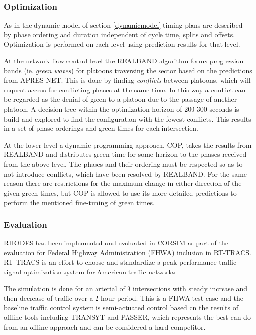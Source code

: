 \subsubsection*{Optimization}
As in the dynamic model of section \ref{dynamicmodel} timing plans are described by phase ordering and duration independent of cycle time, splits and offsets. 
Optimization is performed on each level using prediction results for that level.

At the network flow control level the REALBAND algorithm forms progression bands (ie. \textit{green waves}) for platoons traversing the sector based on the predictions from APRES-NET. This is done by finding \textit{conflicts} between platoons, which will request access for conflicting phases at the same time. In this way a conflict can be regarded as the denial of green to a platoon due to the passage of another platoon. A decision tree within the optimization horizon of 200-300 seconds is build and explored to find the configuration with the fewest conflicts. This results in a set of phase orderings and green times for each intersection.

At the lower level a dynamic programming approach, COP, takes the results from REALBAND and distributes green time for some horizon to the phases received from the above level. The phases and their ordering must be respected so as to not introduce conflicts, which have been resolved by REALBAND. For the same reason there are restrictions for the maximum change in either direction of the given green times, but COP is allowed to use its more detailed predictions to perform the mentioned fine-tuning of green times.

\subsubsection*{Evaluation}
RHODES has been implemented and evaluated in CORSIM as part of the evaluation for Federal Highway Administration (FHWA) inclusion in RT-TRACS. RT-TRACS is an effort to choose and standardize a peak performance traffic signal optimization system for American traffic networks.

The simulation is done for an arterial of 9 intersections with steady increase and then decrease of traffic over a 2 hour period. This is a FHWA test case and the baseline traffic control system is semi-actuated control based on the results of offline tools including TRANSYT and PASSER, which represents the best-can-do from an offline approach and can be considered a hard competitor. 

